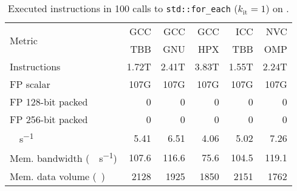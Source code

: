 \begin{table}[t]
	\centering
	\caption*{Executed instructions in 100 calls to \texttt{std::for\_each} ($k_\text{it} = 1$) on \machhydralong.}
	\label{tab:foreach-hw-counters}
	\begin{adjustbox}{max width=\linewidth}
	\begin{tabular}{lrrrrr}
		\toprule
		\multirow{2}{*}{Metric}                       & GCC   & GCC   & GCC   & ICC   & NVC   \\
		                                              & TBB   & GNU   & HPX   & TBB   & OMP   \\
		\midrule
		Instructions                                  & 1.72T & 2.41T & 3.83T & 1.55T & 2.24T \\
		FP scalar                                     & 107G  & 107G  & 107G  & 107G  & 107G  \\
		FP 128-bit packed                             & 0     & 0     & 0     & 0     & 0     \\
		FP 256-bit packed                             & 0     & 0     & 0     & 0     & 0     \\
		\unit{\giga\FLOP\per\second}                  & 5.41  & 6.51  & 4.06  & 5.02  & 7.26  \\
		Mem. bandwidth (\unit{\gibi\byte\per\second}) & 107.6 & 116.6 & 75.6  & 104.5 & 119.1 \\
		Mem. data volume (\unit{\gibi\byte})          & 2128  & 1925  & 1850  & 2151  & 1762  \\
		\bottomrule
	\end{tabular}
	\end{adjustbox}
\end{table}


